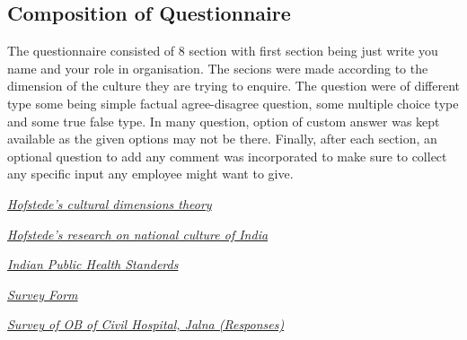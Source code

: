 \documentclass{article}
\begin{document}
\subsection{Composition of Questionnaire}

The questionnaire consisted of 8 section with first section being just write you name and your role in organisation. The secions were made according to the dimension of the culture they are trying to enquire. The question were of different type some being simple factual agree-disagree question, some multiple choice type and some true false type. In many question, option of custom answer was kept available as the given options may not be there. Finally, after each section, an optional question to add any comment was incorporated to make sure to collect any specific input any employee might want to give.


\begin{thebibliography}{99}

    {\em \href{https://en.wikipedia.org/wiki/Hofstede%27s_cultural_dimensions_theory#Dimensions_of_national_culturess/}{Hofstede's cultural dimensions theory}}

    {\em \href{https://www.hofstede-insights.com/country-comparison/india/}{Hofstede's research on national culture of India}}

    {\em \href{https://nhm.gov.in/images/pdf/guidelines/iphs/iphs-revised-guidlines-2022/01-SDH_DH_IPHS_Guidelines-2022.pdf}{Indian Public Health Standerds}}

    {\em \href{https://drive.google.com/file/d/1fBm0hNM2xrKJiMaiN55BHcJJa5gY-k8D/view?usp=share_link}{Survey Form}}

    {\em \href{https://docs.google.com/spreadsheets/d/13JBPbaedCzGmHHtawIFe-Poizsp84CtahEr07WUdKAw/edit?usp=sharing}{Survey of OB of Civil Hospital, Jalna (Responses)}}

\end{thebibliography}
\end{document}

